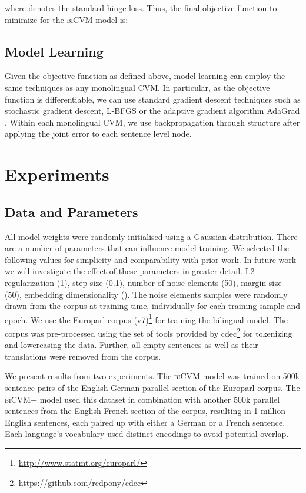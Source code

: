 \documentclass{article} \pdfoutput=1
\newcommand{\biCVM}{\textsc{biCVM}\xspace}
\newcommand{\biCVMplus}{\textsc{biCVM+}\xspace}
\newcommand{\CVM}{\textsc{CVM}\xspace}
\begin{document}
where  denotes the standard hinge loss.
Thus, the final objective function to minimize for the \biCVM model is:

 \subsection{Model Learning}

Given the objective function as defined above, model learning can employ the
same techniques as any monolingual \CVM.  In particular, as the objective
function is differentiable, we can use standard gradient descent techniques such
as stochastic gradient descent, L-BFGS or the adaptive gradient algorithm
AdaGrad \cite{Duchi:2011}. Within each monolingual \CVM, we use backpropagation
through structure after applying the joint error to each sentence level node.

 \section{Experiments}

\subsection{Data and Parameters}

All model weights were randomly initialised using a Gaussian distribution.
There are a number of parameters that can influence model training. We selected
the following values for simplicity and comparability with prior work. In future
work we will investigate the effect of these parameters in greater detail. L2
regularization (1), step-size (0.1), number of noise elements (50), margin size
(50), embedding dimensionality ().  The noise elements samples were
randomly drawn from the corpus at training time, individually for each training
sample and epoch.  We use the Europarl corpus
(v7)\footnote{\url{http://www.statmt.org/europarl/}} for training the bilingual
model.  The corpus was pre-processed using the set of tools provided by
cdec\footnote{\url{https://github.com/redpony/cdec}} \cite{Dyer:2010} for
tokenizing and lowercasing the data. Further, all empty sentences as well as
their translations were removed from the corpus.

We present results from two experiments.  The \biCVM model was trained on 500k
sentence pairs of the English-German parallel section of the Europarl corpus.
The \biCVMplus model used this dataset in combination with another 500k parallel
sentences from the English-French section of the corpus, resulting in 1 million
English sentences, each paired up with either a German or a French sentence.
Each language's vocabulary used distinct encodings to avoid potential overlap.
\end{document}
